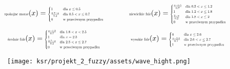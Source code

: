\documentclass{article}
\begin{document}
\begin{equation*}
\begin{minipage}{0.5\textwidth}
\centering
$\text{\scalebox{0.5}{spokojne morze}}(x) =
\scalebox{0.5}{$
\begin{cases}
1 & \text{dla } x \leq 0.5 \\
\frac{0.7 - x}{0.2} & \text{dla } 0.5 < x \leq 0.7 \\
0 & \text{w przeciwnym przypadku}
\end{cases}
$}$
\end{minipage}%
\begin{minipage}{0.5\textwidth}
\centering
$\text{\scalebox{0.5}{niewielkie fale}}(x) =
\scalebox{0.5}{$
\begin{cases}
\frac{x - 0.5}{0.7} & \text{dla } 0.5 < x \leq 1.2 \\
1 & \text{dla } 1.2 < x \leq 1.8 \\
\frac{2 - x}{0.2} & \text{dla } 1.8 < x \leq 2 \\
0 & \text{w przeciwnym przypadku}
\end{cases}
$}$
\end{minipage}
\end{equation*}
\begin{equation*}
\begin{minipage}{0.5\textwidth}
\centering
$\text{\scalebox{0.5}{średnie fale}}(x) =
\scalebox{0.5}{$
\begin{cases}
\frac{x - 1.8}{0.7} & \text{dla } 1.8 < x < 2.5 \\
1 & \text{dla } x = 2.5 \\
\frac{2.7 - x}{0.2} & \text{dla } 2.5 < x \leq 2.7 \\
0 & \text{w przeciwnym przypadku}
\end{cases}
$}$
\end{minipage}%
\begin{minipage}{0.5\textwidth}
\centering
$\text{\scalebox{0.5}{wysokie fale}}(x) =
\scalebox{0.5}{$
\begin{cases}
0 & \text{dla } x \leq 2.6 \\
\frac{x - 2.6}{0.1} & \text{dla } 2.6 < x \leq 2.7 \\
1 & \text{w przeciwnym przypadku}
\end{cases}
$}$
\end{minipage}
\end{equation*}

\begin{figure}[H]
\centering
\texttt{[image: ksr/projekt\_2\_fuzzy/assets/wave\_hight.png]}
\label{fig:epsilon_bat}
\end{figure}
\end{document}
